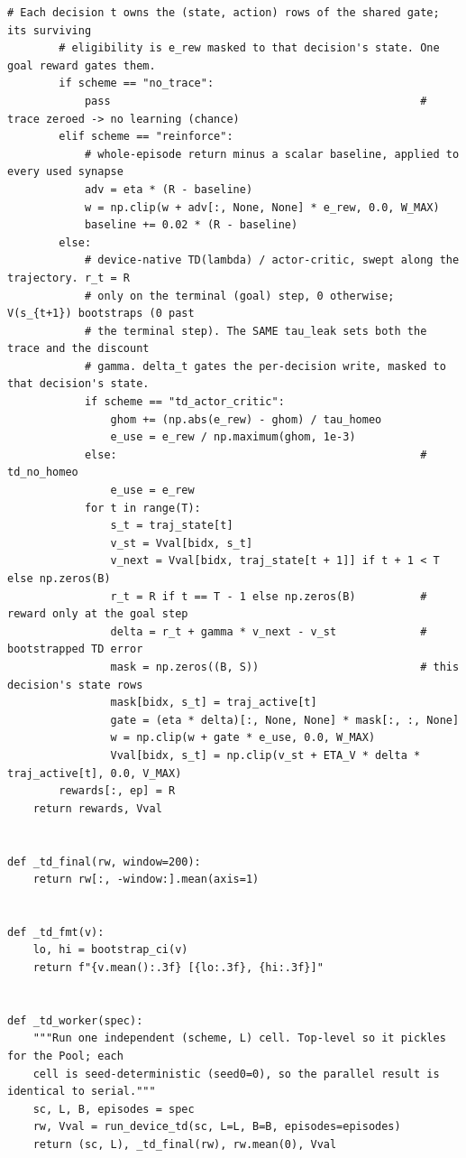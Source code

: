 \begin{lstlisting}[caption={mrl\_trace/extensions.py},label={lst:siox-src-extensions}]
        # Each decision t owns the (state, action) rows of the shared gate; its surviving
        # eligibility is e_rew masked to that decision's state. One goal reward gates them.
        if scheme == "no_trace":
            pass                                                # trace zeroed -> no learning (chance)
        elif scheme == "reinforce":
            # whole-episode return minus a scalar baseline, applied to every used synapse
            adv = eta * (R - baseline)
            w = np.clip(w + adv[:, None, None] * e_rew, 0.0, W_MAX)
            baseline += 0.02 * (R - baseline)
        else:
            # device-native TD(lambda) / actor-critic, swept along the trajectory. r_t = R
            # only on the terminal (goal) step, 0 otherwise; V(s_{t+1}) bootstraps (0 past
            # the terminal step). The SAME tau_leak sets both the trace and the discount
            # gamma. delta_t gates the per-decision write, masked to that decision's state.
            if scheme == "td_actor_critic":
                ghom += (np.abs(e_rew) - ghom) / tau_homeo
                e_use = e_rew / np.maximum(ghom, 1e-3)
            else:                                               # td_no_homeo
                e_use = e_rew
            for t in range(T):
                s_t = traj_state[t]
                v_st = Vval[bidx, s_t]
                v_next = Vval[bidx, traj_state[t + 1]] if t + 1 < T else np.zeros(B)
                r_t = R if t == T - 1 else np.zeros(B)          # reward only at the goal step
                delta = r_t + gamma * v_next - v_st             # bootstrapped TD error
                mask = np.zeros((B, S))                         # this decision's state rows
                mask[bidx, s_t] = traj_active[t]
                gate = (eta * delta)[:, None, None] * mask[:, :, None]
                w = np.clip(w + gate * e_use, 0.0, W_MAX)
                Vval[bidx, s_t] = np.clip(v_st + ETA_V * delta * traj_active[t], 0.0, V_MAX)
        rewards[:, ep] = R
    return rewards, Vval


def _td_final(rw, window=200):
    return rw[:, -window:].mean(axis=1)


def _td_fmt(v):
    lo, hi = bootstrap_ci(v)
    return f"{v.mean():.3f} [{lo:.3f}, {hi:.3f}]"


def _td_worker(spec):
    """Run one independent (scheme, L) cell. Top-level so it pickles for the Pool; each
    cell is seed-deterministic (seed0=0), so the parallel result is identical to serial."""
    sc, L, B, episodes = spec
    rw, Vval = run_device_td(sc, L=L, B=B, episodes=episodes)
    return (sc, L), _td_final(rw), rw.mean(0), Vval



\end{lstlisting}
